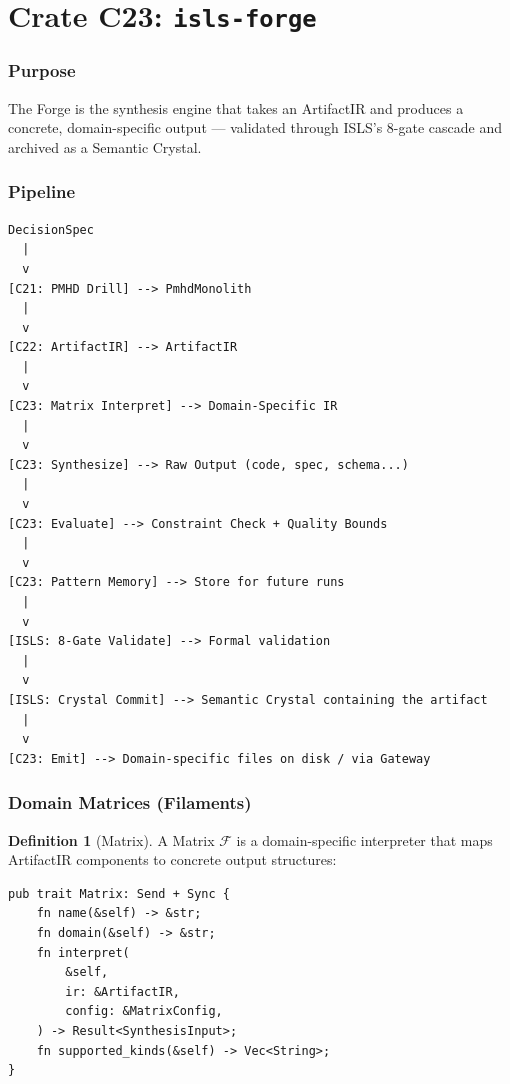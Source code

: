 \documentclass[11pt,a4paper,twoside]{article}
\theoremstyle{definition}
\newtheorem{definition}{Definition}[section]
\theoremstyle{plain}
\theoremstyle{remark}
\newcommand{\ISLS}{\textsf{ISLS}}
\newcommand{\calF}{\mathcal{F}}
\begin{document}
\part{Crate C23: \texttt{isls-forge}}\label{part:forge}

\section{Purpose}\label{sec:forge:purpose}

The Forge is the synthesis engine that takes an ArtifactIR and produces
a concrete, domain-specific output --- validated through \ISLS{}'s
8-gate cascade and archived as a Semantic Crystal.


\section{Pipeline}\label{sec:forge:pipeline}

\begin{lstlisting}[title={Forge Pipeline}]
DecisionSpec
  |
  v
[C21: PMHD Drill] --> PmhdMonolith
  |
  v
[C22: ArtifactIR] --> ArtifactIR
  |
  v
[C23: Matrix Interpret] --> Domain-Specific IR
  |
  v
[C23: Synthesize] --> Raw Output (code, spec, schema...)
  |
  v
[C23: Evaluate] --> Constraint Check + Quality Bounds
  |
  v
[C23: Pattern Memory] --> Store for future runs
  |
  v
[ISLS: 8-Gate Validate] --> Formal validation
  |
  v
[ISLS: Crystal Commit] --> Semantic Crystal containing the artifact
  |
  v
[C23: Emit] --> Domain-specific files on disk / via Gateway
\end{lstlisting}


\section{Domain Matrices (Filaments)}\label{sec:forge:matrix}

\begin{definition}[Matrix]\label{def:matrix}
A Matrix $\calF$ is a domain-specific interpreter that maps
ArtifactIR components to concrete output structures:
\begin{lstlisting}
pub trait Matrix: Send + Sync {
    fn name(&self) -> &str;
    fn domain(&self) -> &str;
    fn interpret(
        &self,
        ir: &ArtifactIR,
        config: &MatrixConfig,
    ) -> Result<SynthesisInput>;
    fn supported_kinds(&self) -> Vec<String>;
}
\end{lstlisting}
\end{definition}
\end{document}
